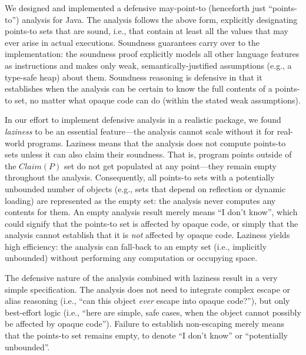 We designed and implemented a defensive may-point-to (henceforth just
``points-to'') analysis for Java. The analysis follows the above form,
explicitly designating points-to sets that are sound, i.e., that contain
at least all the values that may ever arise in actual executions. Soundness
guarantees carry over to the implementation: the soundness proof
explicitly models all other language features as \unknowninstr{}
instructions and makes only weak, semantically-justified assumptions
(e.g., a type-safe heap) about them. Soundness reasoning is defensive
in that it establishes when the analysis can be certain to know the
full contents of a points-to set, no matter what opaque code can do
(within the stated weak assumptions).

In our effort to implement defensive analysis in a realistic package,
we found \emph{laziness} to be an essential feature---the analysis
cannot scale without it for real-world programs. Laziness means
that the analysis does not compute points-to sets unless it can also
claim their soundness. That is, program points outside of the
\(Claim(P)\) set do not get populated at any point---they remain empty
throughout the analysis.  Consequently, all points-to sets with a
potentially unbounded number of objects (e.g., sets that depend on
reflection or dynamic loading) are represented as the empty set: the
analysis never computes any contents for them. An empty analysis
result merely means ``I don't know'', which could signify that the
points-to set is affected by opaque code, or simply that the analysis
cannot establish that it is \emph{not} affected by opaque
code. Laziness yields high efficiency: the analysis can fall-back to
an empty set (i.e., implicitly unbounded) without performing any
computation or occupying space.


The defensive nature of the analysis combined with laziness result in
a very simple specification. The analysis does not need to integrate
complex escape or alias reasoning (i.e., ``can this object \emph{ever}
escape into opaque code?''), but only best-effort logic (i.e., ``here
are simple, safe cases, when the object cannot possibly be affected by
opaque code''). Failure to establish non-escaping merely means that
the points-to set remains empty, to denote ``I don't know'' or
``potentially unbounded''.

